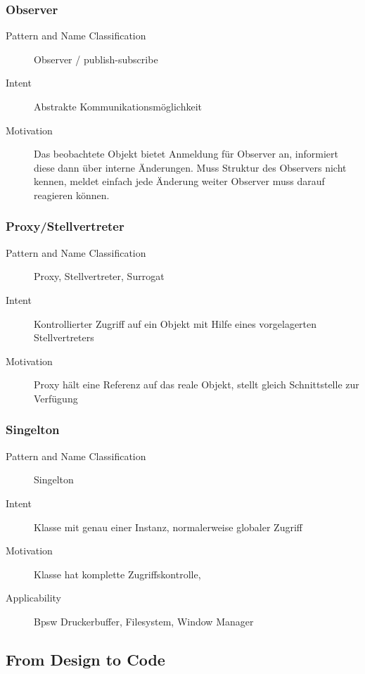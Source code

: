 \documentclass[a4paper, 10pt]{article}
\begin{document}
\subsubsection{Observer}
\begin{description}
	\item[Pattern and Name Classification] Observer / publish-subscribe
	\item[Intent] Abstrakte Kommunikationsmöglichkeit
	\item[Motivation] Das beobachtete Objekt bietet Anmeldung für Observer an, informiert diese dann über interne Änderungen. Muss Struktur des Observers nicht kennen, meldet einfach jede Änderung weiter \follows Observer muss darauf reagieren können.
\end{description}

\subsubsection{Proxy/Stellvertreter}
\begin{description}
	\item[Pattern and Name Classification]Proxy, Stellvertreter, Surrogat
	\item[Intent] Kontrollierter Zugriff auf ein Objekt mit Hilfe eines vorgelagerten Stellvertreters
	\item[Motivation] Proxy hält eine Referenz auf das reale Objekt, stellt gleich Schnittstelle zur Verfügung
	
\end{description}

\subsubsection{Singelton}
\begin{description}
	\item[Pattern and Name Classification] Singelton
	\item[Intent] Klasse mit genau einer Instanz, normalerweise globaler Zugriff
	\item[Motivation] Klasse hat komplette Zugriffskontrolle, 
	\item[Applicability] Bpsw Druckerbuffer, Filesystem, Window Manager
\end{description}

\subsection{From Design to Code}
\end{document}
